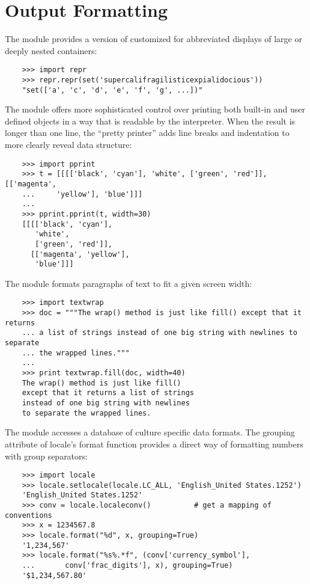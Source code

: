\documentclass{manual}
\begin{document}
\section{Output Formatting\label{output-formatting}}

The  module provides a
version of  customized for abbreviated displays of large
or deeply nested containers:

\begin{verbatim}
    >>> import repr   
    >>> repr.repr(set('supercalifragilisticexpialidocious'))
    "set(['a', 'c', 'd', 'e', 'f', 'g', ...])"
\end{verbatim}

The  module offers
more sophisticated control over printing both built-in and user defined
objects in a way that is readable by the interpreter.  When the result
is longer than one line, the ``pretty printer'' adds line breaks and
indentation to more clearly reveal data structure:

\begin{verbatim}
    >>> import pprint
    >>> t = [[[['black', 'cyan'], 'white', ['green', 'red']], [['magenta',
    ...     'yellow'], 'blue']]]
    ...
    >>> pprint.pprint(t, width=30)
    [[[['black', 'cyan'],
       'white',
       ['green', 'red']],
      [['magenta', 'yellow'],
       'blue']]]
\end{verbatim}

The  module
formats paragraphs of text to fit a given screen width:

\begin{verbatim}
    >>> import textwrap
    >>> doc = """The wrap() method is just like fill() except that it returns
    ... a list of strings instead of one big string with newlines to separate
    ... the wrapped lines."""
    ...
    >>> print textwrap.fill(doc, width=40)
    The wrap() method is just like fill()
    except that it returns a list of strings
    instead of one big string with newlines
    to separate the wrapped lines.
\end{verbatim}

The  module accesses
a database of culture specific data formats.  The grouping attribute
of locale's format function provides a direct way of formatting numbers
with group separators:

\begin{verbatim}
    >>> import locale
    >>> locale.setlocale(locale.LC_ALL, 'English_United States.1252')
    'English_United States.1252'
    >>> conv = locale.localeconv()          # get a mapping of conventions
    >>> x = 1234567.8
    >>> locale.format("%d", x, grouping=True)
    '1,234,567'
    >>> locale.format("%s%.*f", (conv['currency_symbol'],
    ...	      conv['frac_digits'], x), grouping=True)
    '$1,234,567.80'
\end{verbatim}
\end{document}
